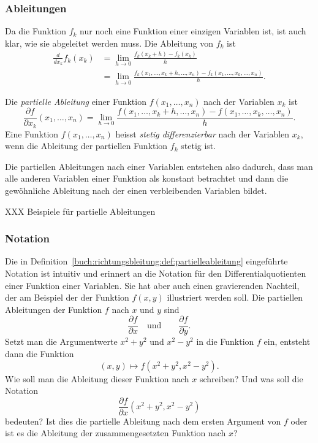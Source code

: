 %
%
\subsubsection{Ableitungen}
Da die Funktion $f_k$ nur noch eine Funktion einer einzigen Variablen
ist, ist auch klar, wie sie abgeleitet werden muss.
Die Ableitung von $f_k$ ist
\begin{align*}
\frac{d}{dx_k} f_k(x_k)
&=
\lim_{h\to 0} \frac{f_k(x_k+h)-f_k(x_k)}{h}
\\
&=
\lim_{h\to 0}
\frac{f_k(x_1,\dots,x_k+h,\dots,x_n)-f_k(x_1,\dots,x_k,\dots,x_n)}{h}.
\end{align*}

\begin{definition}
\label{buch:richtungsbleitung:def:partielleableitung}
Die {\em partielle Ableitung} einer Funktion $f(x_1,\dots,x_n)$ nach der
%
%
Variablen $x_k$ ist
\[
\frac{\partial f}{\partial x_k}(x_1,\dots,x_n)
=
\lim_{h\to 0}
\frac{f(x_1,\dots,x_k+h,\dots,x_n)-f(x_1,\dots,x_k,\dots,x_n)}{h}.
\]
Eine Funktion $f(x_1,\dots,x_n)$ heisst {\em stetig differenzierbar}
nach der Variablen $x_k$, wenn die Ableitung der partiellen Funktion 
$f_k$ stetig ist.
\end{definition}

Die partiellen Ableitungen nach einer Variablen entstehen also dadurch,
dass man alle anderen Variablen einer Funktion als konstant betrachtet
und dann die gewöhnliche Ableitung nach der einen verbleibenden Variablen
bildet.

XXX Beispiele für partielle Ableitungen

%
%
\subsubsection{Notation}
Die in Definition~\ref{buch:richtungsbleitung:def:partielleableitung}
eingeführte Notation ist intuitiv und erinnert an die Notation für den
Differentialquotienten einer Funktion einer Variablen.
Sie hat aber auch einen gravierenden Nachteil, der am Beispiel der
der Funktion $f(x,y)$ illustriert werden soll.
Die partiellen Ableitungen der Funktion $f$ nach $x$ und $y$ sind
\[
\frac{\partial f}{\partial x}
\quad\text{und}\qquad
\frac{\partial f}{\partial y}.
\]
Setzt man die Argumentwerte $x^2+y^2$ und $x^2-y^2$ in die Funktion
$f$ ein, entsteht dann die Funktion
\begin{equation}
(x,y) \mapsto f(x^2+y^2,x^2-y^2).
\label{buch:richtungsableitung:eqn:feingesetzt}
\end{equation}
Wie soll man die Ableitung dieser Funktion nach $x$ schreiben?
Und was soll die Notation
\[
\frac{\partial f}{\partial x}(x^2+y^2,x^2-y^2)
\]
bedeuten?
Ist dies die partielle Ableitung nach dem ersten Argument von $f$
oder ist es die Ableitung der zusammengesetzten Funktion nach $x$?

